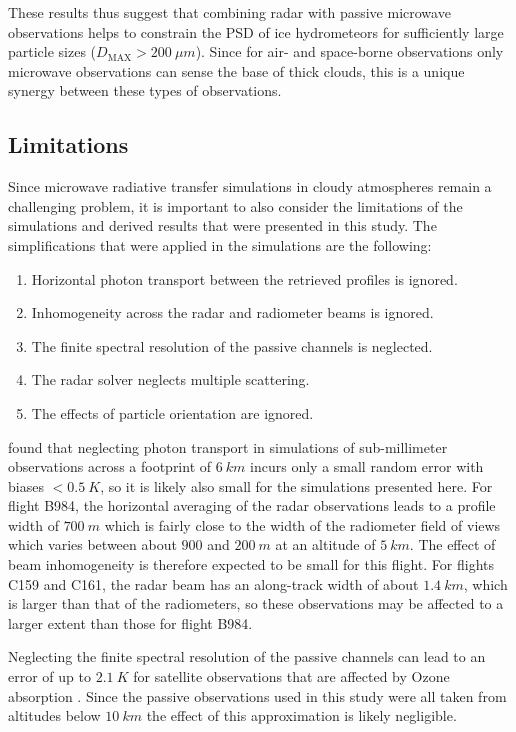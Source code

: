 \documentclass[journal abbreviation, manuscript]{copernicus}
\begin{document}
These results thus suggest that combining radar with passive microwave
observations helps to constrain the PSD of ice hydrometeors for sufficiently
large particle sizes ($D_\text{MAX} > 200\ \unit{\mu m}$). Since for air- and
space-borne observations only microwave observations can sense the base of thick
clouds, this is a unique synergy between these types of observations.

\subsection{Limitations}

Since microwave radiative transfer simulations in cloudy atmospheres remain a
challenging problem, it is important to also consider the limitations of the
simulations and derived results that were presented in this study. The
simplifications that were applied in the simulations are the following:
\begin{enumerate}
  \item Horizontal photon transport between the retrieved profiles is ignored.
  \item Inhomogeneity across the radar and radiometer beams is ignored.
  \item The finite spectral resolution of the passive channels is neglected.
  \item The radar solver neglects multiple scattering.
  \item The effects of particle orientation are ignored.
\end{enumerate}

\citet{barlakas20} found that neglecting photon transport in simulations of
sub-millimeter observations across a footprint of $6\ \unit{km}$ incurs only a
small random error with biases $< 0.5\ \unit{K}$, so it is likely also small for
the simulations presented here. For flight B984, the horizontal averaging of the
radar observations leads to a profile width of $700\ \unit{m}$ which is fairly
close to the width of the radiometer field of views which varies between about
$900$ and $200\ \unit{m}$ at an altitude of $5\ \unit{km}$. The effect of beam
inhomogeneity is therefore expected to be small for this flight. For flights
C159 and C161, the radar beam has an along-track width of about
$1.4\ \unit{km}$, which is larger than that of the radiometers, so these
observations may be affected to a larger extent than those for flight B984.

Neglecting the finite spectral resolution of the passive channels can lead to an
error of up to $2.1\ \unit{K}$ for satellite observations that are affected by
Ozone absorption \citep{eriksson20}. Since the passive observations used in this
study were all taken from altitudes below $10\ \unit{km}$ the effect of this
approximation is likely negligible.
\end{document}
